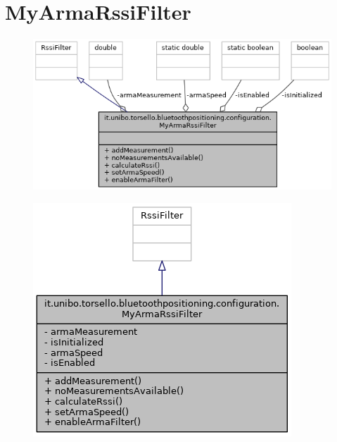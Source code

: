 \newpage
\section{MyArmaRssiFilter}
\begin{figure}[ph]
	\centering
	\includegraphics[width=1\linewidth]{img/uml/class/classit_1_1unibo_1_1torsello_1_1bluetoothpositioning_1_1configuration_1_1MyArmaRssiFilter__coll__graph.png}
	\caption{}
\end{figure}

\begin{figure}[ph]
	\centering
	\includegraphics[width=0.7\linewidth]{img/uml/class/classit_1_1unibo_1_1torsello_1_1bluetoothpositioning_1_1configuration_1_1MyArmaRssiFilter__inherit__graph.png}
	\caption{}
\end{figure}

\newpage
